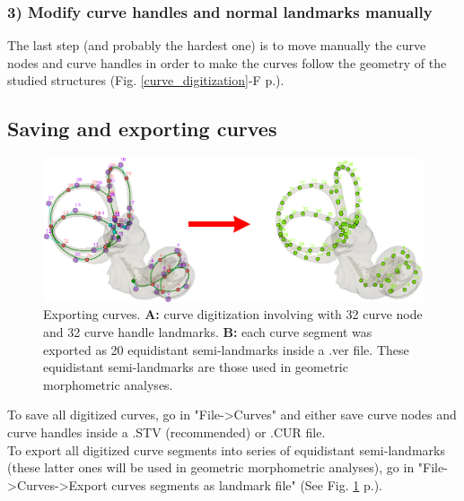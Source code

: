 \documentclass[12pt, a4paper]{book}
\begin{document}
\subsubsection{3) Modify curve handles and normal landmarks manually}
The last step (and probably the hardest one) is to move manually the curve nodes and curve handles in order to make the curves follow the geometry of the studied structures (Fig. \ref{curve_digitization}-F p.\pageref{curve_digitization}).

\subsection{Saving and exporting curves}
\begin{figure}
  \centering
  \includegraphics[scale=0.47]{export.png} 
	\caption{Exporting curves. \textbf{A:} curve digitization involving with 32 curve node and 32 curve handle landmarks. \textbf{B:} each curve segment was exported as 20 equidistant semi-landmarks inside a .ver file. These equidistant semi-landmarks are those used in geometric morphometric analyses.}
	\label{export}
 
\end{figure}
To save all digitized curves, go in "File->Curves" and either save curve nodes and curve handles inside a .STV (recommended) or .CUR file.\\ 
To export all digitized curve segments into series of equidistant semi-landmarks (these latter ones will be used in geometric morphometric analyses), go in "File->Curves->Export curves segments as landmark file" (See Fig. \ref{export} p.\pageref{export}).
\end{document}
